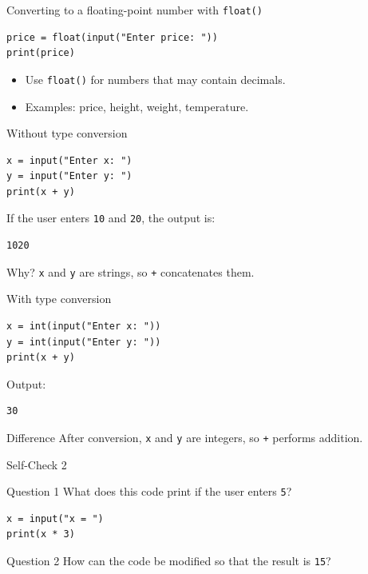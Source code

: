 \documentclass[aspectratio=169,10pt]{beamer}
\begin{document}
\begin{frame}[fragile]{Converting to a floating-point number with \texttt{float()}}
\begin{lstlisting}
price = float(input("Enter price: "))
print(price)
\end{lstlisting}
\begin{itemize}
  \item Use \texttt{float()} for numbers that may contain decimals.
  \item Examples: price, height, weight, temperature.
\end{itemize}
\end{frame}

\begin{frame}[fragile]{Without type conversion}
\begin{lstlisting}
x = input("Enter x: ")
y = input("Enter y: ")
print(x + y)
\end{lstlisting}
If the user enters \texttt{10} and \texttt{20}, the output is:
\begin{verbatim}
1020
\end{verbatim}
\begin{alertblock}{Why?}
\texttt{x} and \texttt{y} are strings, so \texttt{+} concatenates them.
\end{alertblock}
\end{frame}

\begin{frame}[fragile]{With type conversion}
\begin{lstlisting}
x = int(input("Enter x: "))
y = int(input("Enter y: "))
print(x + y)
\end{lstlisting}
Output:
\begin{verbatim}
30
\end{verbatim}
\begin{alertblock}{Difference}
After conversion, \texttt{x} and \texttt{y} are integers, so \texttt{+} performs addition.
\end{alertblock}
\end{frame}

\begin{frame}[fragile]{Self-Check 2}
\begin{block}{Question 1}
What does this code print if the user enters \texttt{5}?
\begin{lstlisting}
x = input("x = ")
print(x * 3)
\end{lstlisting}
\end{block}
\begin{block}{Question 2}
How can the code be modified so that the result is \texttt{15}?
\end{block}
\end{frame}
\end{document}
